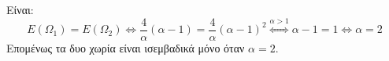 \begin{alist}
\begin{rlist}
    \item Είναι:
        \[ E(\Omega_1) = E(\Omega_2) \Leftrightarrow \frac{4}{\alpha}(\alpha-1) = \frac{4}{\alpha}(\alpha-1)^2 \overset{\alpha>1}{\Leftrightarrow} \alpha-1 = 1 \Leftrightarrow \alpha=2 \]
        Επομένως τα δυο χωρία είναι ισεμβαδικά μόνο όταν $\alpha=2$.
    \end{rlist} 
\end{alist}